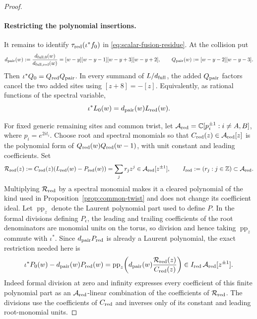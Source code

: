 \begin{proof}
\paragraph{Restricting the polynomial insertions.}
It remains to identify \(\tau_{\rm red}(\iota^*f_0)\) in \eqref{eq:scalar-fusion-residue}. At the collision put
\[
 d_{\rm pair}(w):=\frac{d_{{\rm full},0}(w)}{d_{{\rm full},{\rm red}}(w)}
 =[w-y][w-y-1][w-y+3][w-y+2],
 \qquad Q_{\rm pair}(w):=[w-y-2][w-y-3].
\]
Then \(\iota^*Q_0=Q_{\rm red}Q_{\rm pair}\). In every summand of \(L/d_{\rm full}\), the added \(Q_{\rm pair}\) factors cancel the two added sites using \([z+8]=-[z]\). Equivalently, as rational functions of the spectral variable,
\[
 \iota^*L_0(w)=d_{\rm pair}(w)L_{\rm red}(w).
\]

For fixed generic remaining sites and common twist, let
\(\mathcal A_{\rm red}=\mathbb C[p_i^{\pm1}:i\ne A,B]\), where \(p_i=e^{2it_i}\). Choose root and spectral monomials so that \(C_{\rm red}(z)\in\mathcal A_{\rm red}[z]\) is the polynomial form of \(Q_{\rm red}(w)Q_{\rm red}(w-1)\), with unit constant and leading coefficients. Set
\[
 \mathcal R_{\rm red}(z):=C_{\rm red}(z)(L_{\rm red}(w)-P_{\rm red}(w))
       =\sum_j r_jz^j\in\mathcal A_{\rm red}[z^{\pm1}],
 \qquad
 I_{\rm red}:=(r_j:j\in\mathbb Z)
       \subset\mathcal A_{\rm red}.
\]
Multiplying \(\mathcal R_{\rm red}\) by a spectral monomial makes it a cleared polynomial of the kind used in Proposition~\ref{prop:common-twist} and does not change its coefficient ideal. Let \(\operatorname{pp}_z\) denote the Laurent polynomial part used to define \(P\). In the formal divisions defining \(P_\epsilon\), the leading and trailing coefficients of the root denominators are monomial units on the torus, so division and hence taking \(\operatorname{pp}_z\) commute with \(\iota^*\). Since \(d_{\rm pair}P_{\rm red}\) is already a Laurent polynomial, the exact restriction needed here is
\begin{equation}\label{eq:scalar-fusion-polynomial-ideal}
 \iota^*P_0(w)-d_{\rm pair}(w)P_{\rm red}(w)
 =\operatorname{pp}_z\!\left(d_{\rm pair}(w)
                    \frac{\mathcal R_{\rm red}(z)}{C_{\rm red}(z)}\right)
 \in I_{\rm red}\,\mathcal A_{\rm red}[z^{\pm1}].
\end{equation}
Indeed formal division at zero and infinity expresses every coefficient of this finite polynomial part as an \(\mathcal A_{\rm red}\)-linear combination of the coefficients of \(\mathcal R_{\rm red}\). The divisions use the coefficients of \(C_{\rm red}\) and inverses only of its constant and leading root-monomial units.


\end{proof}

